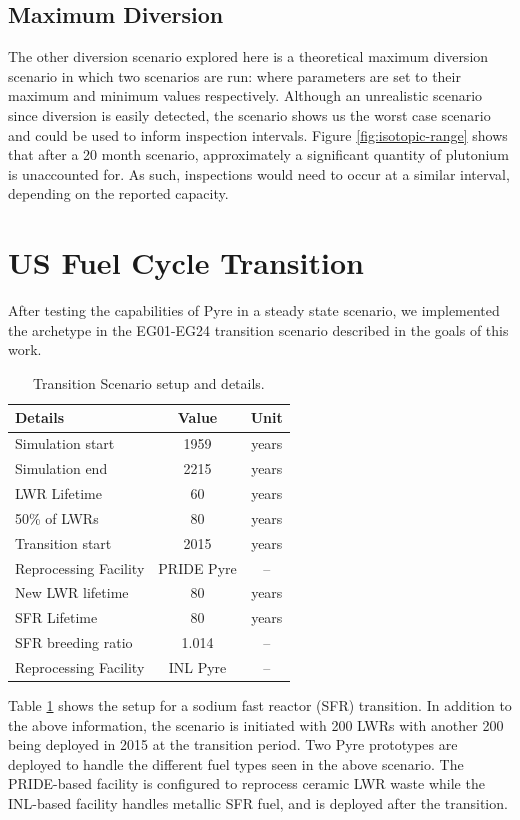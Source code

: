 \subsection{Maximum Diversion}
The other diversion scenario explored here is a theoretical maximum diversion scenario in which two scenarios are run: where parameters are set to their maximum and minimum values
respectively. Although an unrealistic scenario since diversion is easily detected, the scenario shows us the worst case scenario and could be used to inform inspection intervals.
Figure \ref{fig:isotopic-range} shows that after a 20 month scenario, approximately a significant quantity of plutonium is unaccounted for. As such, inspections would need to occur
at a similar interval, depending on the reported capacity.

\section{US Fuel Cycle Transition}

After testing the capabilities of Pyre in a steady state scenario, we implemented the archetype in the EG01-EG24 transition scenario described in the goals of this work. 

\begin{table}[h]
	\centering
	\begin{tabularx}{0.5\linewidth}{lcc}
		\hline
		\textbf{Details} & \textbf{Value} & \textbf{Unit} \\
		\hline \hline
		Simulation start & 1959 & years \\ \hline
		Simulation end & 2215 & years \\ \hline
		LWR Lifetime & 60 & years \\ 
		50\% of LWRs & 80 & years \\ \hline
		Transition start & 2015 & years \\ \hline
		Reprocessing Facility & PRIDE Pyre & -- \\ \hline
		New LWR lifetime & 80 & years \\ \hline
		SFR Lifetime & 80 & years \\ \hline
		SFR breeding ratio & 1.014 & -- \\ \hline
		Reprocessing Facility & INL Pyre & -- \\ \hline
	\end{tabularx}
	\caption {Transition Scenario setup and details.}
	\label {tab:setup}
\end{table}

Table \ref{tab:setup} shows the setup for a sodium fast reactor (SFR) transition. In addition to the above information, the scenario is initiated with 200 LWRs with another 200 being deployed
in 2015 at the transition period. Two Pyre prototypes are deployed to handle the different fuel types seen in the above scenario. The PRIDE-based facility is configured to reprocess ceramic
LWR waste while the INL-based facility handles metallic SFR fuel, and is deployed after the transition. 


